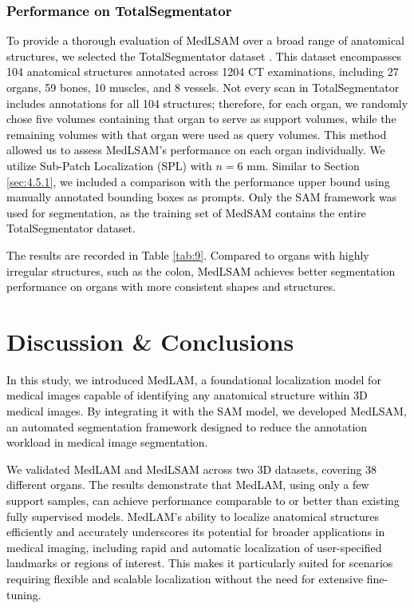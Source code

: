 \documentclass[times,twocolumn,final]{elsarticle}
\begin{document}
\subsubsection{\textcolor{black}{Performance on TotalSegmentator}}

\textcolor{black}{
To provide a thorough evaluation of MedLSAM over a broad range of anatomical structures, we selected the TotalSegmentator dataset \cite{wasserthal2023totalsegmentator}. This dataset encompasses 104 anatomical structures annotated across 1204 CT examinations, including 27 organs, 59 bones, 10 muscles, and 8 vessels. Not every scan in TotalSegmentator includes annotations for all 104 structures; therefore, for each organ, we randomly chose five volumes containing that organ to serve as support volumes, while the remaining volumes with that organ were used as query volumes. This method allowed us to assess MedLSAM's performance on each organ individually. We utilize Sub-Patch Localization (SPL) with $n=6$ mm. Similar to Section \ref{sec:4.5.1}, we included a comparison with the performance upper bound using manually annotated bounding boxes as prompts. Only the SAM framework was used for segmentation, as the training set of MedSAM \cite{MedSAM} contains the entire TotalSegmentator dataset.
}
\par \textcolor{black}{
The results are recorded in Table \ref{tab:9}. Compared to organs with highly irregular structures, such as the colon, MedLSAM achieves better segmentation performance on organs with more consistent shapes and structures.
}

\section{Discussion \& Conclusions}
\textcolor{black}{In this study, we introduced MedLAM, a foundational localization model for medical images capable of identifying any anatomical structure within 3D medical images. By integrating it with the SAM model, we developed MedLSAM, an automated segmentation framework designed to reduce the annotation workload in medical image segmentation.}

\textcolor{black}{We validated MedLAM and MedLSAM across two 3D datasets, covering 38 different organs. The results demonstrate that MedLAM, using only a few support samples, can achieve performance comparable to or better than existing fully supervised models. MedLAM’s ability to localize anatomical structures efficiently and accurately underscores its potential for broader applications in medical imaging, including rapid and automatic localization of user-specified landmarks or regions of interest. This makes it particularly suited for scenarios requiring flexible and scalable localization without the need for extensive fine-tuning.}
\end{document}
